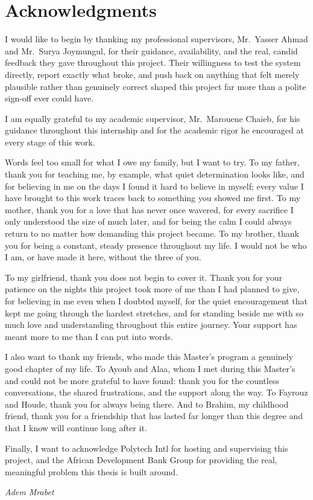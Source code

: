 \chapter*{Acknowledgments}

I would like to begin by thanking my professional supervisors, Mr.~Yasser Ahmad and Mr.~Surya Joymungul, for their guidance, availability, and the real, candid feedback they gave throughout this project. Their willingness to test the system directly, report exactly what broke, and push back on anything that felt merely plausible rather than genuinely correct shaped this project far more than a polite sign-off ever could have.

I am equally grateful to my academic supervisor, Mr.~Marouene Chaieb, for his guidance throughout this internship and for the academic rigor he encouraged at every stage of this work.

Words feel too small for what I owe my family, but I want to try. To my father, thank you for teaching me, by example, what quiet determination looks like, and for believing in me on the days I found it hard to believe in myself; every value I have brought to this work traces back to something you showed me first. To my mother, thank you for a love that has never once wavered, for every sacrifice I only understood the size of much later, and for being the calm I could always return to no matter how demanding this project became. To my brother, thank you for being a constant, steady presence throughout my life. I would not be who I am, or have made it here, without the three of you.

To my girlfriend, thank you does not begin to cover it. Thank you for your patience on the nights this project took more of me than I had planned to give, for believing in me even when I doubted myself, for the quiet encouragement that kept me going through the hardest stretches, and for standing beside me with so much love and understanding throughout this entire journey. Your support has meant more to me than I can put into words.

I also want to thank my friends, who made this Master's program a genuinely good chapter of my life. To Ayoub and Alaa, whom I met during this Master's and could not be more grateful to have found: thank you for the countless conversations, the shared frustrations, and the support along the way. To Fayrouz and Houde, thank you for always being there. And to Brahim, my childhood friend, thank you for a friendship that has lasted far longer than this degree and that I know will continue long after it.

Finally, I want to acknowledge Polytech Intl for hosting and supervising this project, and the African Development Bank Group for providing the real, meaningful problem this thesis is built around.

\vspace{2cm}
\begin{flushright}
\textit{Adem Mrabet}
\end{flushright}

\newpage
\thispagestyle{empty}
\mbox{}
